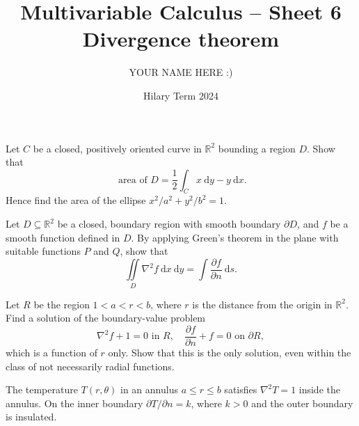 \documentclass[answers]{exam}
\title{Multivariable Calculus -- Sheet 6\\Divergence theorem}
\author{YOUR NAME HERE :)}
\date{Hilary Term 2024}
\begin{document}
\maketitle
\begin{questions}

\question%
Let $C$ be a closed, positively oriented curve in $\mathbb{R}^{2}$ bounding a region $D$. Show that \[
	\text { area of } D=\frac{1}{2} \int_{C} x \mathrm{~d} y-y \mathrm{~d} x.
\] Hence find the area of the ellipse $x^{2} / a^{2}+y^{2} / b^{2}=1$.



\question%
Let $D \subseteq \mathbb{R}^{2}$ be a closed, boundary region with smooth boundary $\partial D$, and $f$ be a smooth function defined in $D$. By applying Green's theorem in the plane with suitable functions $P$ and $Q$, show that \[
	\iint\limits_{D} \nabla^{2} f \mathrm{~d} x \mathrm{~d} y=\int \frac{\partial f}{\partial n} \mathrm{~d} s.
\]



\question%
Let $R$ be the region $1<a<r<b$, where $r$ is the distance from the origin in $\mathbb{R}^{2}$. Find a solution of the boundary-value problem \[
	\nabla^{2} f+1=0 \text { in } R, \quad \frac{\partial f}{\partial n}+f=0 \text { on } \partial R,
\] which is a function of $r$ only. Show that this is the only solution, even within the class of not necessarily radial functions.



\question%
The temperature $T(r, \theta)$ in an annulus $a \leqslant r \leqslant b$ satisfies $\nabla^{2} T=1$ inside the annulus. On the inner boundary $\partial T / \partial n=k$, where $k>0$ and the outer boundary is insulated.




\end{questions}
\end{document}
